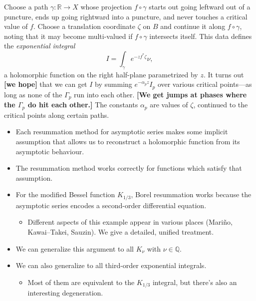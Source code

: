 \documentclass{article}
\newcommand{\maps}{\colon}
\newcommand{\R}{\mathbb{R}}
\begin{document}
\begin{itemize}
\color{Turquoise}
Choose a path $\gamma \maps \R \to X$ whose projection $f \circ \gamma$ starts out going leftward out of a puncture, ends up going rightward into a puncture, and never touches a critical value of $f$. Choose a translation coordinate $\zeta$ on $B$ and continue it along $f \circ \gamma$, noting that it may become multi-valued if $f \circ \gamma$ intersects itself. This data defines the {\em exponential integral}
\[ I = \int_\gamma e^{-z f^*\zeta} \nu, \]
a holomorphic function on the right half-plane parametrized by $z$. It turns out \textbf{[we hope]} that we can get $I$ by summing $e^{-\alpha_p z} I_p$ over various critical points---as long as none of the $\Gamma_p$ run into each other. \textbf{[We get jumps at phases where the $\Gamma_p$ do hit each other.]} The constants $\alpha_p$ are values of $\zeta$, continued to the critical points along certain paths.
\color{black}
\end{itemize}
\begin{itemize}
\item Each resummation method for asymptotic series makes some implicit assumption that allows us to reconstruct a holomorphic function from its asymptotic behaviour.
\item The resummation method works correctly for functions which satisfy that assumption.
\item For the modified Bessel function $K_{1/3}$, Borel resummation works because the asymptotic series encodes a second-order differential equation.
\begin{itemize}
\item Different aspects of this example appear in various places (Mari\~{n}o, Kawai--Takei, Sauzin). We give a detailed, unified treatment.
\end{itemize}
\item We can generalize this argument to all $K_\nu$ with $\nu \in \mathbb{Q}$.
\item We can also generalize to all third-order exponential integrals.
\begin{itemize}
\item Most of them are equivalent to the $K_{1/3}$ integral, but there's also an interesting degeneration.
\end{itemize}
\end{itemize}
\color{black}
\end{document}

